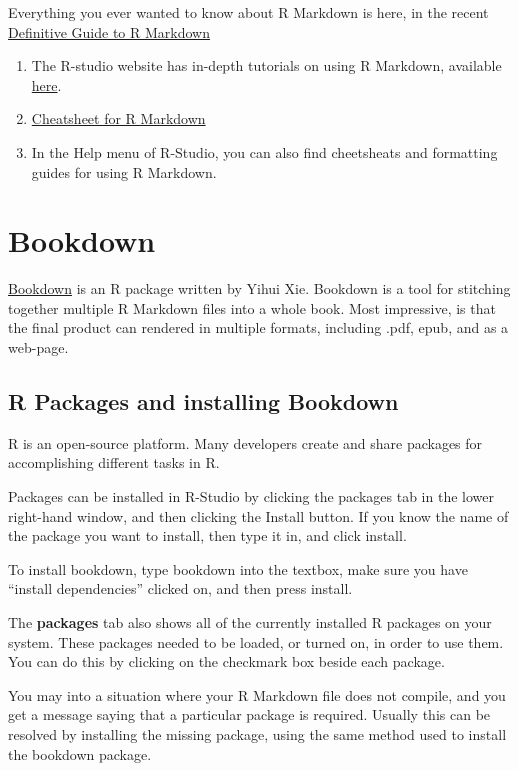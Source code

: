 \documentclass[]{book}
\providecommand{\tightlist}{%
  \setlength{\itemsep}{0pt}\setlength{\parskip}{0pt}}
\theoremstyle{definition}
\theoremstyle{definition}
\theoremstyle{definition}
\theoremstyle{remark}
\begin{document}
Everything you ever wanted to know about R Markdown is here, in the
recent \href{https://bookdown.org/yihui/rmarkdown/}{Definitive Guide to
R Markdown}

\begin{enumerate}
\def\labelenumi{\arabic{enumi}.}
\tightlist
\item
  The R-studio website has in-depth tutorials on using R Markdown,
  available \href{http://rmarkdown.rstudio.com/lesson-1.html}{here}.
\item
  \href{http://rmarkdown.rstudio.com/lesson-15.html}{Cheatsheet for R
  Markdown}
\item
  In the Help menu of R-Studio, you can also find cheetsheats and
  formatting guides for using R Markdown.
\end{enumerate}

\chapter{Bookdown}\label{bookdown-1}

\href{https://bookdown.org/yihui/bookdown/}{Bookdown} is an R package
written by Yihui Xie. Bookdown is a tool for stitching together multiple
R Markdown files into a whole book. Most impressive, is that the final
product can rendered in multiple formats, including .pdf, epub, and as a
web-page.

\section{R Packages and installing
Bookdown}\label{r-packages-and-installing-bookdown}

R is an open-source platform. Many developers create and share packages
for accomplishing different tasks in R.

Packages can be installed in R-Studio by clicking the packages tab in
the lower right-hand window, and then clicking the Install button. If
you know the name of the package you want to install, then type it in,
and click install.

To install bookdown, type bookdown into the textbox, make sure you have
``install dependencies'' clicked on, and then press install.

The \textbf{packages} tab also shows all of the currently installed R
packages on your system. These packages needed to be loaded, or turned
on, in order to use them. You can do this by clicking on the checkmark
box beside each package.

You may into a situation where your R Markdown file does not compile,
and you get a message saying that a particular package is required.
Usually this can be resolved by installing the missing package, using
the same method used to install the bookdown package.
\end{document}
